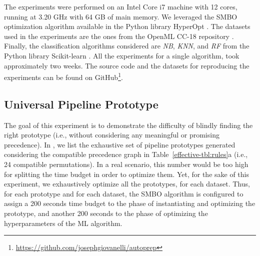 The experiments were performed on an Intel Core i7 machine with 12 cores, running at 3.20 GHz with 64 GB of main memory.
We leveraged the SMBO optimization algorithm available in the Python library HyperOpt \cite{bergstra2015hyperopt}.
The datasets used in the experiments are the ones from the OpenML CC-18 repository \cite{OpenML2013}.
Finally, the classification algorithms considered are \textit{NB}, \textit{KNN}, and \textit{RF} from the Python library Scikit-learn \cite{scikit-learn}.
All the experiments for a single algorithm, took approximately two weeks.
The source code and the datasets for reproducing the experiments can be found on GitHub\footnote{
\url{https://github.com/josephgiovanelli/autoprep}}.

\subsection{Universal Pipeline Prototype}
\label{effective-sec:eval-universal-pipeline}
The goal of this experiment is to demonstrate the difficulty of blindly finding the right prototype (i.e., without considering any meaningful or promising precedence).
In , we list the exhaustive set of pipeline prototypes generated considering the compatible precedence graph in Table~\ref{effective-tbl:rules}a (i.e., 24 compatible permutations).
In a real scenario, this number would be too high for splitting the time budget in order to optimize them.
Yet, for the sake of this experiment, we exhaustively optimize all the prototypes, for each dataset.
Thus, for each prototype and for each dataset, the SMBO algorithm is configured to assign a 200 seconds time budget to the phase of instantiating and optimizing the prototype, and another 200 seconds to the phase of optimizing the hyperparameters of the ML algorithm.

